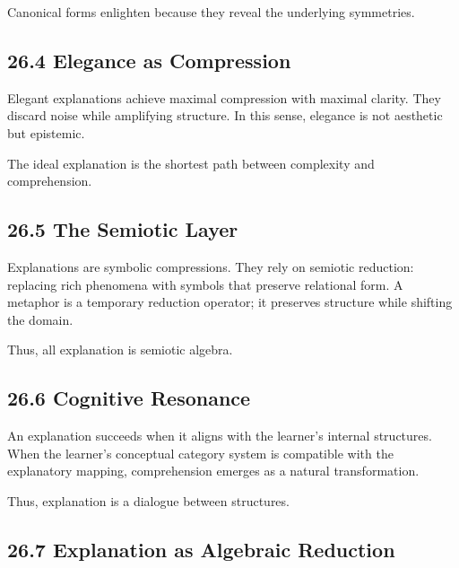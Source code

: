\documentclass[12pt,letterpaper]{article}
\theoremstyle{remark}
\begin{document}
Canonical forms enlighten because they reveal the underlying symmetries.

\subsection{26.4 Elegance as Compression}

Elegant explanations achieve maximal compression with maximal clarity. They discard noise while amplifying structure. In this sense, elegance is not aesthetic but epistemic.

The ideal explanation is the shortest path between complexity and comprehension.

\subsection{26.5 The Semiotic Layer}

Explanations are symbolic compressions. They rely on semiotic reduction: replacing rich phenomena with symbols that preserve relational form. A metaphor is a temporary reduction operator; it preserves structure while shifting the domain.

Thus, all explanation is semiotic algebra.

\subsection{26.6 Cognitive Resonance}

An explanation succeeds when it aligns with the learner’s internal structures. When the learner’s conceptual category system is compatible with the explanatory mapping, comprehension emerges as a natural transformation.

Thus, explanation is a dialogue between structures.

\subsection{26.7 Explanation as Algebraic Reduction}
\end{document}
